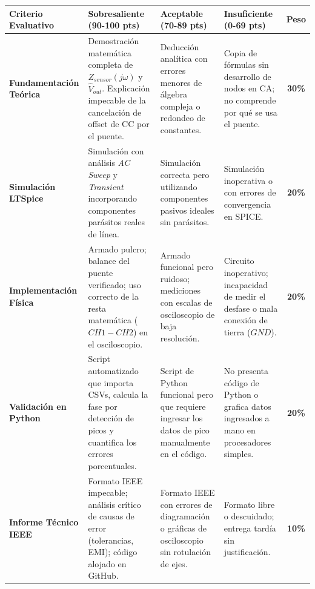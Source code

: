 \documentclass[11pt,a4paper]{article}
\begin{document}
\begin{table}[h!]
    \centering
    \renewcommand{\arraystretch}{1.3} 
    \begin{tabularx}{\textwidth}{|>{\raggedright\arraybackslash}p{2.5cm}|>{\raggedright\arraybackslash}X|>{\raggedright\arraybackslash}X|>{\raggedright\arraybackslash}X|c|}
        \hline
        \textbf{Criterio Evaluativo} & \textbf{Sobresaliente (90-100 pts)} & \textbf{Aceptable (70-89 pts)} & \textbf{Insuficiente (0-69 pts)} & \textbf{Peso} \\
        \hline
        \textbf{Fundamentación Teórica} & Demostración matemática completa de $Z_{sensor}(j\omega)$ y $\hat{V}_{out}$. Explicación impecable de la cancelación de offset de CC por el puente. & Deducción analítica con errores menores de álgebra compleja o redondeo de constantes. & Copia de fórmulas sin desarrollo de nodos en CA; no comprende por qué se usa el puente. & \textbf{30\%} \\
        \hline
        \textbf{Simulación LTSpice} & Simulación con análisis \textit{AC Sweep} y \textit{Transient} incorporando componentes parásitos reales de línea. & Simulación correcta pero utilizando componentes pasivos ideales sin parásitos. & Simulación inoperativa o con errores de convergencia en SPICE. & \textbf{20\%} \\
        \hline
        \textbf{Implementación Física} & Armado pulcro; balance del puente verificado; uso correcto de la resta matemática ($CH1-CH2$) en el osciloscopio. & Armado funcional pero ruidoso; mediciones con escalas de osciloscopio de baja resolución. & Circuito inoperativo; incapacidad de medir el desfase o mala conexión de tierra ($GND$). & \textbf{20\%} \\
        \hline
        \textbf{Validación en Python} & Script automatizado que importa CSVs, calcula la fase por detección de picos y cuantifica los errores porcentuales. & Script de Python funcional pero que requiere ingresar los datos de pico manualmente en el código. & No presenta código de Python o grafica datos ingresados a mano en procesadores simples. & \textbf{20\%} \\
        \hline
        \textbf{Informe Técnico IEEE} & Formato IEEE impecable; análisis crítico de causas de error (tolerancias, EMI); código alojado en GitHub. & Formato IEEE con errores de diagramación o gráficas de osciloscopio sin rotulación de ejes. & Formato libre o descuidado; entrega tardía sin justificación. & \textbf{10\%} \\
        \hline
    \end{tabularx}
\end{table}
\end{document}
